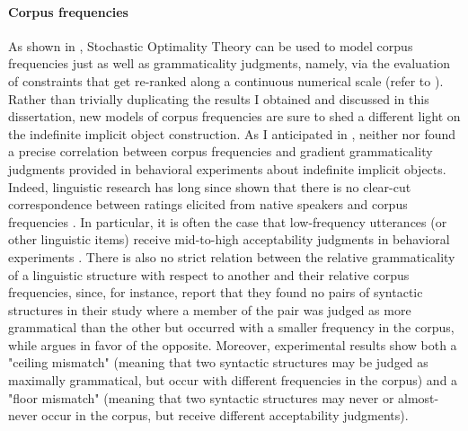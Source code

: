 \paragraph{Corpus frequencies}

As shown in \textcite{Boersma2004, BoersmaHayes2001empirical}, Stochastic Optimality Theory can be used to model corpus frequencies just as well as grammaticality judgments, namely, via the evaluation of constraints that get re-ranked along a continuous numerical scale (refer to ). Rather than trivially duplicating the results I obtained and discussed in this dissertation, new models of corpus frequencies are sure to shed a different light on the indefinite implicit object construction. As I anticipated in , neither \textcite{Resnik1993, Resnik1996} nor \textcite{Medina2007} found a precise correlation between corpus frequencies and gradient grammaticality judgments provided in behavioral experiments about indefinite implicit objects.\\
Indeed, linguistic research has long since shown that there is no clear-cut correspondence between ratings elicited from native speakers and corpus frequencies \parencite{manning2003probabilistic}. In particular, it is often the case that low-frequency utterances (or other linguistic items) receive mid-to-high acceptability judgments in behavioral experiments \parencite{KempenHarbusch2005, BermelKnittl2012, BaderHaussler2010, Boersma2004, KellerAsudeh2002}. There is also no strict relation between the relative grammaticality of a linguistic structure with respect to another and their relative corpus frequencies, since, for instance, \textcite[315-316]{BaderHaussler2010} report that they found no pairs of syntactic structures in their study where a member of the pair was judged as more grammatical than the other but occurred with a smaller frequency in the corpus, while \textcite{Boersma2004} argues in favor of the opposite. Moreover, \textcite{BaderHaussler2010} experimental results show both a "ceiling mismatch" (meaning that two syntactic structures may be judged as maximally grammatical, but occur with different frequencies in the corpus) and a "floor mismatch" (meaning that two syntactic structures may never or almost-never occur in the corpus, but receive different acceptability judgments).\\
